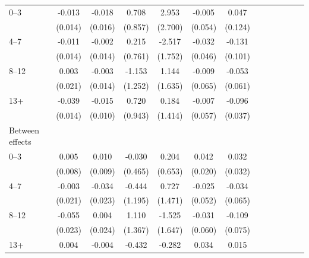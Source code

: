 \documentclass[12pt,english]{article}
\begin{document}
\begin{table}[!ht]
\begin{center}
\begin{adjustbox}{max width=.9\linewidth}
\begin{threeparttable}
{\begin{tabular}{l*{6}{S S}}
						0--3 &    -0.013         &   -0.018         &    0.708         &    2.953         &   -0.005         &    0.047         \\
						&  (0.014)         &  (0.016)         &  (0.857)         &  (2.700)         &  (0.054)         &  (0.124)         \\
						4--7 &    -0.011         &   -0.002         &    0.215         &   -2.517         &   -0.032         &   -0.131         \\
						&  (0.014)         &  (0.014)         &  (0.761)         &  (1.752)         &  (0.046)         &  (0.101)         \\
						8--12 &    0.003         &   -0.003         &   -1.153         &    1.144         &   -0.009         &   -0.053         \\
						&  (0.021)         &  (0.014)         &  (1.252)         &  (1.635)         &  (0.065)         &  (0.061)         \\
						13+ &    -0.039\sym{***}&   -0.015         &    0.720         &    0.184         &   -0.007         &   -0.096\sym{***}\\
						&  (0.014)         &  (0.010)         &  (0.943)         &  (1.414)         &  (0.057)         &  (0.037)         \\
						Between effects&                  &                  &                  &                  &                  &                  \\
						0--3 &    0.005         &    0.010         &   -0.030         &    0.204         &    0.042\sym{**} &    0.032         \\
						&  (0.008)         &  (0.009)         &  (0.465)         &  (0.653)         &  (0.020)         &  (0.032)         \\
						4--7 &    -0.003         &   -0.034         &   -0.444         &    0.727         &   -0.025         &   -0.034         \\
						&  (0.021)         &  (0.023)         &  (1.195)         &  (1.471)         &  (0.052)         &  (0.065)         \\
						8--12 &   -0.055\sym{**} &    0.004         &    1.110         &   -1.525         &   -0.031         &   -0.109         \\
						&  (0.023)         &  (0.024)         &  (1.367)         &  (1.647)         &  (0.060)         &  (0.075)         \\
						13+ &    0.004         &   -0.004         &   -0.432         &   -0.282         &    0.034\sym{*}  &    0.015         \\

\end{tabular}}
\end{threeparttable}
\end{adjustbox}
\end{center}
\end{table}
\end{document}
